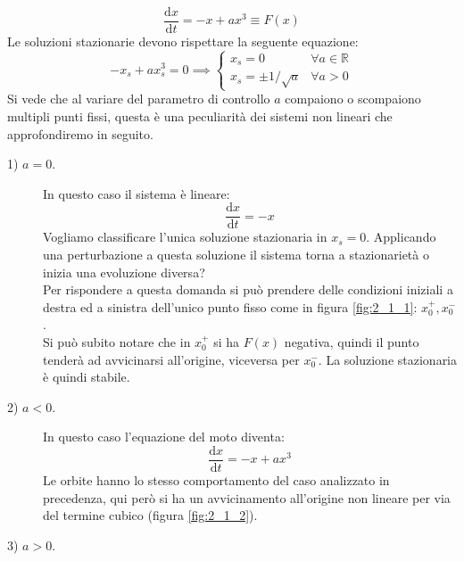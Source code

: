 \begin{exmp}
    \[
	\frac{\text{d} x}{\text{d} t} = -x + ax^3 \equiv F(x)
    \] 
    Le soluzioni stazionarie devono rispettare la seguente equazione:
    \[
        -x_s + ax_s^3 = 0 \implies  
	\begin{cases}
	    x_s = 0 & \forall a \in \mathbb{R}\\
	    x_s = \pm 1 / \sqrt{a} & \forall a > 0
        \end{cases}
    \] 
    Si vede che al variare del parametro di controllo $a$ compaiono o scompaiono multipli punti fissi, questa è una peculiarità dei sistemi non lineari che approfondiremo in seguito. 
    \begin{description}
	\item[1) $a = 0$.] In questo caso il sistema è lineare:
	    \[
	        \frac{\text{d} x}{\text{d} t} = -x
	    \] 
	    Vogliamo classificare l'unica soluzione stazionaria in $x_s = 0$. Applicando una perturbazione a questa soluzione il sistema torna a stazionarietà o inizia una evoluzione diversa? \\
	    Per rispondere a questa domanda si può prendere delle condizioni iniziali a destra ed a sinistra dell'unico punto fisso come in figura \ref{fig:2_1_1}: $x_0^+, x_0^-$. \\
	    Si può subito notare che in $x_0^+$ si ha $F(x)$ negativa, quindi il punto tenderà ad avvicinarsi all'origine, viceversa per $x_0^-$. La soluzione stazionaria è quindi stabile.
        \item[2) $a < 0$.] 
	    In questo caso l'equazione del moto diventa:
	    \[
	        \frac{\text{d} x}{\text{d} t} = -x + ax^3
	    \] 
	    Le orbite hanno lo stesso comportamento del caso analizzato in precedenza, qui però si ha un avvicinamento all'origine non lineare per via del termine cubico (figura \ref{fig:2_1_2}).
	\item[3) $a>0$.]
\end{description}
\end{exmp}

